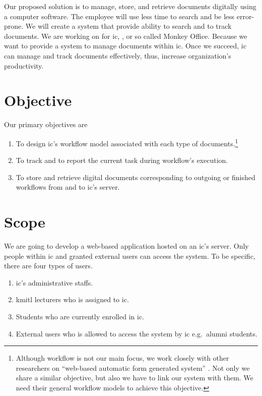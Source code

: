 Our proposed solution is to manage, store, and retrieve documents digitally using a computer software.
The employee will use less time to search and be less error-prone.
We will create a system that provide ability to search and to track documents.
We are working on \MakeLowercase{\projTitle} for \gls{ic}, \kmitl, or so called Monkey Office.
Because we want to provide a system to manage documents within \gls{ic}.
Once we succeed, \gls{ic} can manage and track documents effectively, thus, increase organization's productivity.

\section{Objective}
Our primary objectives are
\begin{enumerate}
\item To design \gls{ic}'s workflow model associated with each type of documents.\footnote{
	Although workflow is not our main focus, we work closely with other researchers on \enquote{web-based automatic form generated system} \cite{web-based-form}.
	Not only we share a similar objective, but also we have to link our system with them.
	We need their general workflow models to achieve this objective.
	}
\item To track and to report the current task during workflow's execution.
\item To store and retrieve digital documents corresponding to outgoing or finished workflows from and to \gls{ic}'s server.
\end{enumerate}

\section{Scope}
We are going to develop a web-based application hosted on an \gls{ic}'s server.
Only people within \gls{ic} and granted external users can access the system.
To be specific, there are four types of users.
\begin{enumerate}
\item \gls{ic}'s administrative staffs.
\item \gls{kmitl} lecturers who is assigned to \gls{ic}.
\item Students who are currently enrolled in \gls{ic}.
\item External users who is allowed to access the system by \gls{ic} e.g.\ alumni students.
\end{enumerate}

